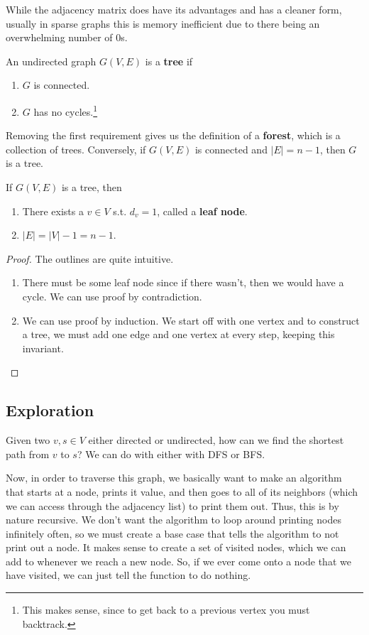   While the adjacency matrix does have its advantages and has a cleaner form, usually in sparse graphs this is memory inefficient due to there being an overwhelming number of $0$s. 

  \begin{definition}[Trees]
    An undirected graph $G(V, E)$ is a \textbf{tree} if 
    \begin{enumerate}
      \item $G$ is connected. 
      \item $G$ has no cycles.\footnote{This makes sense, since to get back to a previous vertex you must backtrack.}
    \end{enumerate}
    Removing the first requirement gives us the definition of a \textbf{forest}, which is a collection of trees. Conversely, if $G(V, E)$ is connected  and $|E| = n - 1$, then $G$ is a tree. 
  \end{definition}

  \begin{theorem}
    If $G(V, E)$ is a tree, then 
    \begin{enumerate}
      \item There exists a $v \in V$ s.t. $d_v = 1$, called a \textbf{leaf node}. 
      \item $|E| = |V| - 1 = n - 1$. 
    \end{enumerate}
  \end{theorem}
  \begin{proof}
    The outlines are quite intuitive. 
    \begin{enumerate}
      \item There must be some leaf node since if there wasn't, then we would have a cycle. We can use proof by contradiction. 
      \item We can use proof by induction. We start off with one vertex and to construct a tree, we must add one edge and one vertex at every step, keeping this invariant.  
    \end{enumerate}
  \end{proof}

\subsection{Exploration}

  Given two $v, s \in V$ either directed or undirected, how can we find the shortest path from $v$ to $s$? We can do with either with DFS or BFS. 

  Now, in order to traverse this graph, we basically want to make an algorithm that starts at a node, prints it value, and then goes to all of its neighbors (which we can access through the adjacency list) to print them out. Thus, this is by nature recursive. We don't want the algorithm to loop around printing nodes infinitely often, so we must create a base case that tells the algorithm to not print out a node. It makes sense to create a set of visited nodes, which we can add to whenever we reach a new node. So, if we ever come onto a node that we have visited, we can just tell the function to do nothing. 

